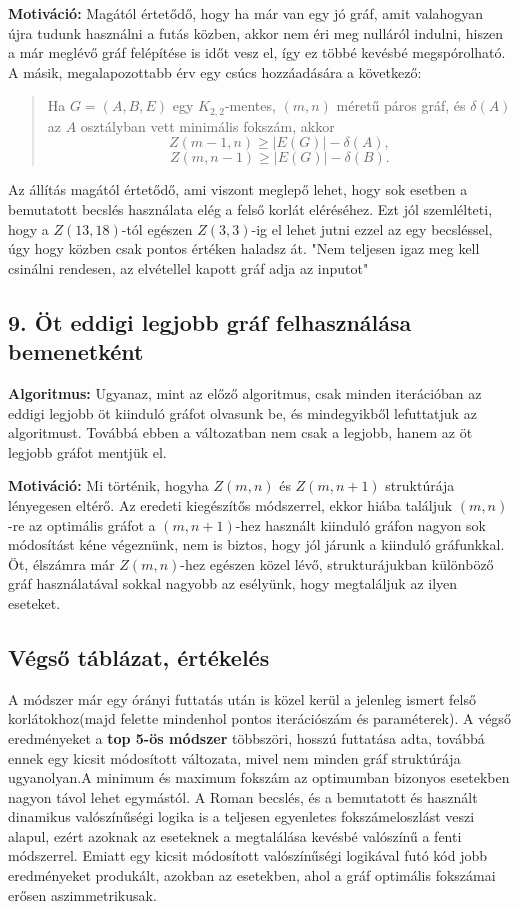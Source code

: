 \documentclass[12pt,a4paper]{article}
\begin{document}
\textbf{Motiváció:} Magától értetődő, hogy ha már van egy jó gráf, amit valahogyan újra tudunk használni a futás közben, akkor nem éri meg nulláról indulni, hiszen a már meglévő gráf felépítése is időt vesz el, így ez többé kevésbé megspórolható. A másik, megalapozottabb érv egy csúcs hozzáadására a következő:

\begin{quote}
Ha $G = (A, B, E)$ egy $K_{2,2}$-mentes, $(m,n)$ méretű páros gráf, és $\delta(A)$ az $A$ osztályban vett minimális fokszám, akkor
\[
Z(m-1, n) \geq |E(G)| - \delta(A),
\]
\[
Z(m, n-1) \geq |E(G)| - \delta(B).
\]
\end{quote}
Az állítás magától értetődő, ami viszont meglepő lehet, hogy sok esetben a bemutatott becslés használata elég a felső korlát eléréséhez. Ezt jól szemlélteti, hogy a $Z(13, 18)$-tól egészen $Z(3, 3)$-ig el lehet jutni ezzel az egy becsléssel, úgy hogy közben csak pontos értéken haladsz át. "Nem teljesen igaz meg kell csinálni rendesen, az elvétellel kapott gráf adja az inputot"

\subsection*{9. Öt eddigi legjobb gráf felhasználása bemenetként}
\textbf{Algoritmus:} Ugyanaz, mint az előző algoritmus, csak minden iterációban az eddigi legjobb öt kiinduló gráfot olvasunk be, és mindegyikből lefuttatjuk az algoritmust. Továbbá ebben a változatban nem csak a legjobb, hanem az öt legjobb gráfot mentjük el.

\textbf{Motiváció:} Mi történik, hogyha $Z(m,n)$ és $Z(m,n+1)$ struktúrája lényegesen eltérő. Az eredeti kiegészítős módszerrel, ekkor hiába találjuk $(m,n)$-re az optimális gráfot a $(m,n+1)$-hez használt kiinduló gráfon nagyon sok módosítást kéne végeznünk, nem is biztos, hogy jól járunk a kiinduló gráfunkkal. Öt, élszámra már $Z(m,n)$-hez egészen közel lévő, strukturájukban különböző gráf használatával sokkal nagyobb az esélyünk, hogy megtaláljuk az ilyen eseteket.

\subsection*{Végső táblázat, értékelés}

A módszer már egy órányi futtatás után is közel kerül a jelenleg ismert felső korlátokhoz(majd felette mindenhol pontos iterációszám és paraméterek). A végső eredményeket a \textbf{top 5-ös módszer} többszöri, hosszú futtatása adta, továbbá ennek egy kicsit módosított változata, mivel nem minden gráf struktúrája ugyanolyan.A minimum és maximum fokszám az optimumban bizonyos esetekben nagyon távol lehet egymástól. A Roman becslés, és a bemutatott és használt dinamikus valószínűségi logika is a teljesen egyenletes fokszámeloszlást veszi alapul, ezért azoknak az eseteknek a megtalálása kevésbé valószínű a fenti módszerrel.
Emiatt egy kicsit módosított valószínűségi logikával futó kód jobb eredményeket produkált, azokban az esetekben, ahol a gráf optimális fokszámai erősen aszimmetrikusak.
\end{document}
